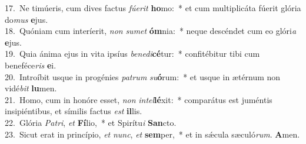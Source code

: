 {17.~}Ne timúeris, cum dives factus \textit{fú}\textit{e}\textit{rit} \textbf{ho}mo:~* et cum multiplicáta fúerit glória do\textit{mus} \textbf{e}jus.\\
{18.~}Quóniam cum interíerit, \textit{non} \textit{su}\textit{met} \textbf{óm}nia:~* neque descéndet cum eo glóri\textit{a} \textbf{e}jus.\\
{19.~}Quia ánima ejus in vita ipsíus \textit{be}\textit{ne}\textit{di}\textbf{cé}tur:~* confitébitur tibi cum beneféce\textit{ris} \textbf{e}i.\\
{20.~}Introíbit usque in progénies \textit{pa}\textit{trum} \textit{su}\textbf{ó}rum:~* et usque in ætérnum non vidé\textit{bit} \textbf{lu}men.\\
{21.~}Homo, cum in honóre esset, \textit{non} \textit{in}\textit{tel}\textbf{lé}xit:~* comparátus est juméntis insipiéntibus, et símilis factus \textit{est} \textbf{il}lis.\\
{22.~}Glória \textit{Pa}\textit{tri}, \textit{et} \textbf{Fí}lio,~* et Spirítu\textit{i} \textbf{San}cto.\\
{23.~}Sicut erat in princípio, \textit{et} \textit{nunc}, \textit{et} \textbf{sem}per,~* et in sǽcula sæculó\textit{rum}. \textbf{A}men.\\
